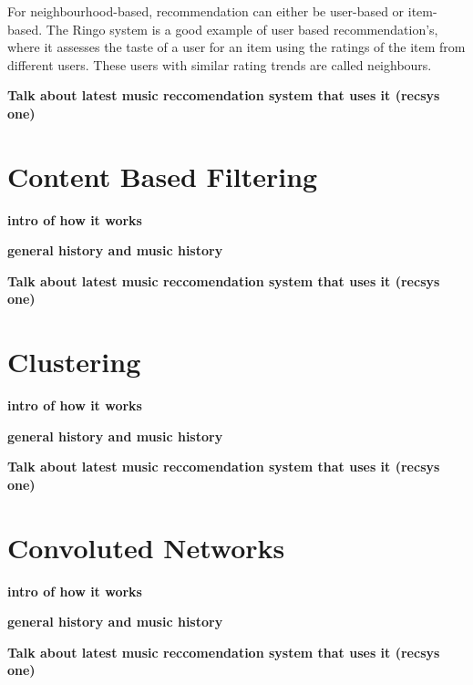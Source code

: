 For neighbourhood-based, recommendation can either be user-based or item-based. The Ringo system is a good example of user based recommendation's, where it assesses the taste of a user for an item using the ratings of the item from different users. These users with similar rating trends are called neighbours. 

\textbf{Talk about latest music reccomendation system that uses it (recsys one)}
\section{Content Based Filtering}
\textbf{intro of how it works}

\textbf{general history and music history}

\textbf{Talk about latest music reccomendation system that uses it (recsys one)}
\section{Clustering}
\textbf{intro of how it works}

\textbf{general history and music history}

\textbf{Talk about latest music reccomendation system that uses it (recsys one)}

\section{Convoluted Networks}
\textbf{intro of how it works}

\textbf{general history and music history}

\textbf{Talk about latest music reccomendation system that uses it (recsys one)}

